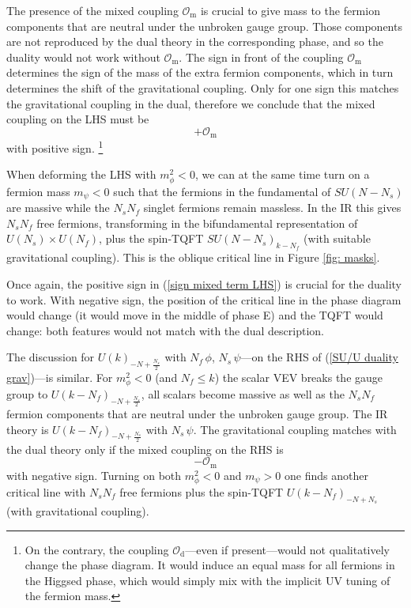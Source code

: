 \documentclass[a4paper, 12pt]{article}
\numberwithin{equation}{section}
\newcommand{\be}{\begin{equation}} \newcommand{\ee}{\end{equation}}
\newcommand{\cO}{\mathcal{O}}
\begin{document}
The presence of the mixed coupling $\cO_\text{m}$ is crucial to give mass to the fermion components that are neutral under the unbroken gauge group. Those components are not reproduced by the dual theory in the corresponding phase, and so the duality would not work without $\cO_\text{m}$. The sign in front of the coupling $\cO_\text{m}$ determines the sign of the mass of the extra fermion components, which in turn determines the shift of the gravitational coupling. Only for one sign this matches the gravitational coupling in the dual, therefore we conclude that the mixed coupling on the LHS must be
\be
\label{sign mixed term LHS}
+ \cO_\text{m}
\ee
with positive sign.%
\footnote{On the contrary, the coupling $\cO_\text{d}$---even if present---would not qualitatively change the phase diagram. It would induce an equal mass for all fermions in the Higgsed phase, which would simply mix with the implicit UV tuning of the fermion mass.}

When deforming the LHS with $m_\phi^2<0$, we can at the same time turn on a fermion mass $m_\psi<0$ such that the fermions in the fundamental of $SU(N-N_s)$ are massive while the $N_s N_f$ singlet fermions remain massless. In the IR this gives $N_s N_f$ free fermions, transforming in the bifundamental representation of $U(N_s) \times U(N_f)$, plus the spin-TQFT $SU(N-N_s)_{k-N_f}$ (with suitable gravitational coupling). This is the oblique critical line in Figure \ref{fig: masks}.

Once again, the positive sign in (\ref{sign mixed term LHS}) is crucial for the duality to work. With negative sign, the position of the critical line in the phase diagram would change (it would move in the middle of phase E) and the TQFT would change: both features would not match with the dual description.

The discussion for $U(k)_{-N + \frac{N_s}2}$ with $N_f\,\phi$, $N_s\,\psi$---on the RHS of (\ref{SU/U duality grav})---is similar. For $m_\phi^2<0$ (and $N_f \leq k$) the scalar VEV breaks the gauge group to $U(k - N_f)_{-N + \frac{N_s}2}$, all scalars become massive as well as the $N_sN_f$ fermion components that are neutral under the unbroken gauge group. The IR theory is $U(k - N_f)_{-N + \frac{N_s}2}$ with $N_s\,\psi$. The gravitational coupling matches with the dual theory only if the mixed coupling on the RHS is
\be
- \cO_\text{m}
\ee
with negative sign. Turning on both $m_\phi^2<0$ and $m_\psi>0$ one finds another critical line with $N_sN_f$ free fermions plus the spin-TQFT $U(k-N_f)_{-N+N_s}$ (with gravitational coupling).
\end{document}
